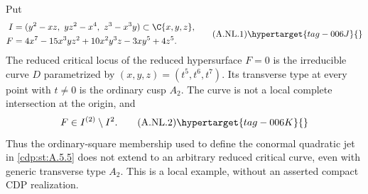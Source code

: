 \begin{proposition}\hypertarget{tag-01AK}{}\label{cdp:st:A.2.6}

Put
\[
 \begin{aligned}
 I&=(y^2-xz,\ yz^2-x^4,\ z^3-x^3y)\subset\C\{x,y,z\},\\
 F&=4x^7-15x^3yz^2+10x^2y^3z-3xy^5+4z^5.
 \end{aligned}                                                   \tag{A.NL.1}\hypertarget{tag-006J}{}\label{cdp:eq:A.NL.1}
\]
The reduced critical locus of the reduced hypersurface $F=0$ is the
irreducible curve $D$ parametrized by $(x,y,z)=(t^5,t^6,t^7)$.
Its transverse type at every point with $t\ne0$ is the ordinary cusp
$A_2$. The curve is not a local complete intersection at the origin,
and
\[
             F\in I^{(2)}\setminus I^2.                         \tag{A.NL.2}\hypertarget{tag-006K}{}\label{cdp:eq:A.NL.2}
\]
Thus the ordinary-square membership used to define the conormal
quadratic jet in \ref{cdp:st:A.5.5} does not extend to an arbitrary reduced
critical curve, even with generic transverse type $A_2$.
This is a local example, without an asserted compact CDP realization.
\end{proposition}


